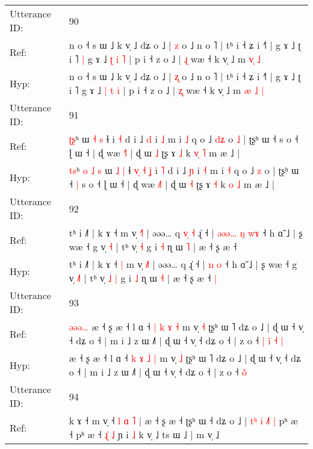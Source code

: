 \documentclass[10pt]{article}
\DeclareRobustCommand{\hl}[1]{{\textcolor{red}{#1}}}
\begin{document}
\begin{longtable}{ll}
 \\
\midrule
Utterance ID: & 90 \\
Ref: & n o ˧ s ɯ ˩ k v̩ ˩ dʑ o ˩ | \hl{z} o ˩ n o ˥ | tʰ i ˧ ʑ i ˧˥ | g ɤ ˩ ʈ i ˥\hl{ }\hl{|} g ɤ ˩ \hl{ʈ} \hl{i} \hl{˥} | p i ˧ z o ˩ | \hl{ɻ} wæ ˧ k v̩ ˩ m \hl{}\hl{v}\hl{̩} \hl{˩}
 \\
Hyp: & n o ˧ s ɯ ˩ k v̩ ˩ dʑ o ˩ | \hl{ʐ} o ˩ n o ˥ | tʰ i ˧ ʑ i ˧˥ | g ɤ ˩ ʈ i ˥\hl{}\hl{} g ɤ ˩ \hl{|} \hl{t} \hl{i} | p i ˧ z o ˩ | \hl{ʐ} wæ ˧ k v̩ ˩ m \hl{æ}\hl{ }\hl{˩} \hl{|}
 \\
\midrule
Utterance ID: & 91 \\
Ref: & \hl{ʈ}\hl{ʂ}ʰ\hl{}\hl{}\hl{}\hl{}\hl{}\hl{} ɯ \hl{˧} \hl{s} ɬ\hl{}\hl{}\hl{}\hl{}\hl{}\hl{}\hl{} i \hl{˧} d i ˩ \hl{d} i \hl{˩} m i \hl{˩} q o ˩ \hl{d}\hl{ʑ} o\hl{ }\hl{˩} | ʈʂʰ ɯ ˧\hl{}\hl{} s o ˧ ɭ ɯ ˧ | ɖ wæ \hl{˧}˥ | ɖ ɯ \hl{˩} ʈʂ ɤ \hl{˩} k \hl{v}\hl{̩} \hl{˥} m æ ˩ |
 \\
Hyp: & \hl{t}\hl{s}ʰ\hl{ }\hl{o}\hl{ }\hl{˩}\hl{ }\hl{s} ɯ \hl{˩} \hl{|} ɬ\hl{ }\hl{v}\hl{̩}\hl{ }\hl{˧}\hl{ }\hl{ʝ} i \hl{˥} d i ˩ \hl{ɲ} i \hl{˧} m i \hl{˧} q o ˩ \hl{}\hl{z} o\hl{}\hl{} | ʈʂʰ ɯ ˧\hl{ }\hl{|} s o ˧ ɭ ɯ ˧ | ɖ wæ \hl{˩}˥ | ɖ ɯ \hl{˧} ʈʂ ɤ \hl{˧} k \hl{}\hl{o} \hl{˩} m æ ˩ |
 \\
\midrule
Utterance ID: & 92 \\
Ref: & tʰ i ˩˥ | k ɤ ˧\hl{}\hl{} m v̩ \hl{˧}˥ | əəə… q\hl{ }\hl{v}\hl{̩}\hl{ }\hl{˧} ɻ̍ ˧ |\hl{ }\hl{ə}\hl{ə}\hl{ə}\hl{…} \hl{ŋ} \hl{w}\hl{ɤ} ˧ h ɑ̃ ˩ | ʂ wæ ˧ g v̩ \hl{}\hl{˧} | tʰ v̩\hl{}\hl{} \hl{˧} g i \hl{˧} ɳ ɯ \hl{˥} | æ ˧ ʂ æ ˧\hl{}\hl{}
 \\
Hyp: & tʰ i ˩˥ | k ɤ ˧\hl{ }\hl{|} m v̩ \hl{˩}˥ | əəə… q\hl{}\hl{}\hl{}\hl{}\hl{} ɻ̍ ˧ |\hl{}\hl{}\hl{}\hl{}\hl{} \hl{n} \hl{}\hl{o} ˧ h ɑ̃ ˩ | ʂ wæ ˧ g v̩ \hl{˩}\hl{˥} | tʰ v̩\hl{ }\hl{˩} \hl{|} g i \hl{˩} ɳ ɯ \hl{˧} | æ ˧ ʂ æ ˧\hl{ }\hl{|}
 \\
\midrule
Utterance ID: & 93 \\
Ref: & \hl{ə}\hl{ə}\hl{ə}\hl{…}\hl{ }æ ˧ ʂ æ ˧ l ɑ ˧ \hl{|} \hl{k} \hl{ɤ} \hl{˧} m v̩ \hl{˧} ʈʂʰ ɯ ˥ dʑ o ˩ | ɖ ɯ ˧ v̩ ˧ dʑ o ˧ | m i ˩ z ɯ ˩˥ | ɖ ɯ ˧ v̩ ˧ dʑ o ˧ | z o ˧\hl{ }\hl{|} \hl{i}̃\hl{ }\hl{˧}\hl{ }\hl{|}
 \\
Hyp: & \hl{}\hl{}\hl{}\hl{}\hl{}æ ˧ ʂ æ ˧ l ɑ ˧ \hl{k} \hl{ɤ} \hl{˩} \hl{|} m v̩ \hl{˩} ʈʂʰ ɯ ˥ dʑ o ˩ | ɖ ɯ ˧ v̩ ˧ dʑ o ˧ | m i ˩ z ɯ ˩˥ | ɖ ɯ ˧ v̩ ˧ dʑ o ˧ | z o ˧\hl{}\hl{} \hl{o}̃\hl{}\hl{}\hl{}\hl{}
 \\
\midrule
Utterance ID: & 94 \\
Ref: & k ɤ ˧\hl{} m v̩ ˧\hl{ }\hl{l}\hl{ }\hl{ɑ}\hl{ }\hl{˥} | æ ˧ ʂ æ ˧\hl{}\hl{} ʈʂʰ ɯ ˧ dʑ o ˩ |\hl{ }\hl{t}\hl{ʰ}\hl{ }\hl{i} \hl{˩}\hl{˥} \hl{|} pʰ æ ˧ pʰ æ ˧\hl{ }\hl{ɻ}\hl{̍}\hl{ }\hl{˩} ɲ i \hl{˩} k v̩ ˩ ts ɯ ˩ | m v̩ ˩\hl{}\hl{}

\end{longtable}
\end{document}
